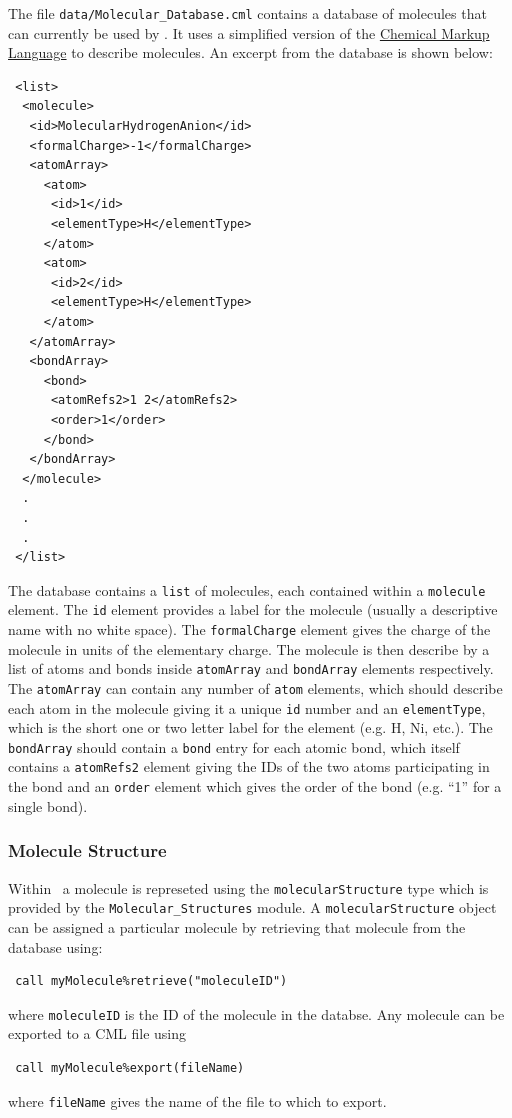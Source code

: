 The file {\tt data/Molecular\_Database.cml} contains a database of molecules that can currently be used by \glc. It uses a simplified version of the \href{http://www.xml-cml.org}{Chemical Markup Language} to describe molecules. An excerpt from the database is shown below:
\begin{verbatim}
 <list>
  <molecule>
   <id>MolecularHydrogenAnion</id>
   <formalCharge>-1</formalCharge>
   <atomArray>
     <atom>
      <id>1</id>
      <elementType>H</elementType>
     </atom>
     <atom>
      <id>2</id>
      <elementType>H</elementType>
     </atom>
   </atomArray>
   <bondArray>
     <bond>
      <atomRefs2>1 2</atomRefs2>
      <order>1</order>
     </bond>
   </bondArray>
  </molecule>
  .
  .
  .
 </list>
\end{verbatim}
The database contains a {\tt list} of molecules, each contained within a {\tt molecule} element. The {\tt id} element provides a label for the molecule (usually a descriptive name with no white space). The {\tt formalCharge} element gives the charge of the molecule in units of the elementary charge. The molecule is then describe by a list of atoms and bonds inside {\tt atomArray} and {\tt bondArray} elements respectively. The {\tt atomArray} can contain any number of {\tt atom} elements, which should describe each atom in the molecule giving it a unique {\tt id} number and an {\tt elementType}, which is the short one or two letter label for the element (e.g. H, Ni, etc.). The {\tt bondArray} should contain a {\tt bond} entry for each atomic bond, which itself contains a {\tt atomRefs2} element giving the IDs of the two atoms participating in the bond and an {\tt order} element which gives the order of the bond (e.g. ``1'' for a single bond).

\subsubsection{Molecule Structure}

Within \glc\ a molecule is represeted using the {\tt molecularStructure} type which is provided by the {\tt Molecular\_Structures} module. A {\tt molecularStructure} object can be assigned a particular molecule by retrieving that molecule from the database using:
\begin{verbatim}
 call myMolecule%retrieve("moleculeID")
\end{verbatim}
where {\tt moleculeID} is the ID of the molecule in the databse. Any molecule can be exported to a CML file using
\begin{verbatim}
 call myMolecule%export(fileName)
\end{verbatim}
where {\tt fileName} gives the name of the file to which to export.

